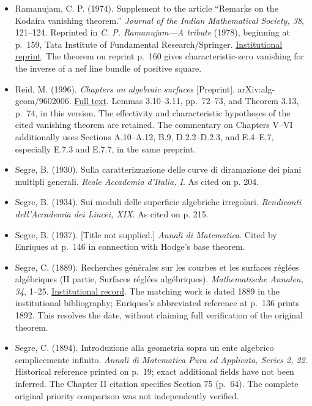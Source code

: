 \begin{sloppypar}
\begin{itemize}
\item Ramanujam, C. P. (1974). Supplement to the article ``Remarks on the Kodaira vanishing theorem.'' \emph{Journal of the Indian Mathematical Society, 38}, 121--124. Reprinted in \emph{C. P. Ramanujam---A tribute} (1978), beginning at p.~159, Tata Institute of Fundamental Research/Springer. \href{https://mathweb.tifr.res.in/Documents/Publications/Studies/CP-Ramanujam-A-Tribute.pdf}{Institutional reprint}. The theorem on reprint p.~160 gives characteristic-zero vanishing for the inverse of a nef line bundle of positive square.

\item Reid, M. (1996). \emph{Chapters on algebraic surfaces} {[}Preprint{]}. arXiv:alg-geom/9602006. \href{https://arxiv.org/pdf/alg-geom/9602006}{Full text}. Lemmas 3.10--3.11, pp.~72--73, and Theorem 3.13, p.~74, in this version. The effectivity and characteristic hypotheses of the cited vanishing theorem are retained. The commentary on Chapters V--VI additionally uses Sections A.10--A.12, B.9, D.2.2--D.2.3, and E.4--E.7, especially E.7.3 and E.7.7, in the same preprint.

\item Segre, B. (1930). Sulla caratterizzazione delle curve di diramazione dei piani multipli generali. \emph{Reale Accademia d'Italia, I}. As cited on p. 204.

\item Segre, B. (1934). Sui moduli delle superficie algebriche irregolari. \emph{Rendiconti dell'Accademia dei Lincei, XIX}. As cited on p. 215.

\item Segre, B. (1937). {[}Title not supplied.{]} \emph{Annali di Matematica}. Cited by Enriques at p.~146 in connection with Hodge's base theorem.

\item Segre, C. (1889). Recherches générales sur les courbes et les surfaces réglées algébriques (II partie, Surfaces réglées algébriques). \emph{Mathematische Annalen, 34}, 1--25. \href{https://bdim.dma.unina.it/item?id=GM_Segre_1889_1}{Institutional record}. The matching work is dated 1889 in the institutional bibliography; Enriques's abbreviated reference at p.~136 prints 1892. This resolves the date, without claiming full verification of the original theorem.

\item Segre, C. (1894). Introduzione alla geometria sopra un ente algebrico semplicemente infinito. \emph{Annali di Matematica Pura ed Applicata, Series 2, 22}. Historical reference printed on p.~19; exact additional fields have not been inferred. The Chapter II citation specifies Section 75 (p.~64). The complete original priority comparison was not independently verified.


\end{itemize}
\end{sloppypar}
